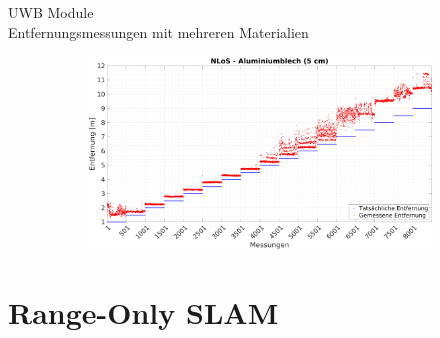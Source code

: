 \documentclass{beamer}
\begin{document}
\begin{frame}{UWB Module\\\normalsize{Entfernungsmessungen mit mehreren Materialien}}
\begin{figure}
\begin{subfigure}[t]{0.47\linewidth}
		\end{subfigure}
		\hfill
		\begin{subfigure}[t]{0.47\linewidth}
			\centering
			\includegraphics[width=\linewidth]{entfernungsmessung_2018_01_20_nlos_metal2}
		\end{subfigure}
	\end{figure}
\end{frame}


%
% 
%
\part{Range-Only SLAM}
\end{document}
